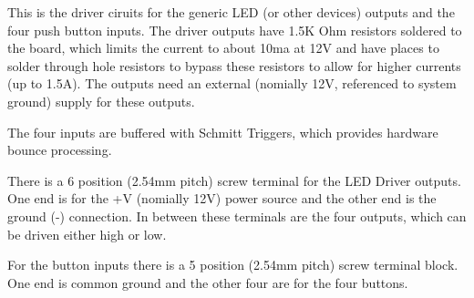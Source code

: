 This is the driver ciruits for the generic LED (or other devices) outputs and
the four push button inputs. The driver outputs have 1.5K Ohm resistors
soldered to the board, which limits the current to about 10ma at 12V and have
places to solder through hole resistors to bypass these resistors to allow for
higher currents (up to 1.5A). The outputs need an external (nomially 12V,
referenced to system ground) supply for these outputs.

The four inputs are buffered with Schmitt Triggers, which provides hardware 
bounce processing.

There is a 6 position (2.54mm pitch) screw terminal for the LED Driver 
outputs.  One end is for the +V (nomially 12V) power source and the other end 
is the ground (-) connection.  In between these terminals are the four 
outputs, which can be driven either high or low.

For the button inputs there is a 5 position (2.54mm pitch) screw terminal 
block. One end is common ground and the other four are for the four buttons.

